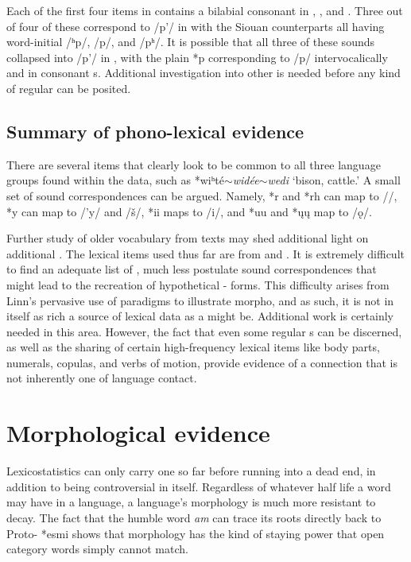 \documentclass[output=paper]{LSP/langsci}
\begin{document}
Each of the first four items in  contains a bilabial consonant in , , and . Three out of four of these correspond to /p'/ in  with the Siouan counterparts all having word-initial /ʰp/, /p/, and /pʰ/. It is possible that all three of these sounds collapsed into /p'/ in , with the plain *p corresponding to  /p/ intervocalically and in consonant s. Additional investigation into other  is needed before any kind of regular  can be posited.

\subsection{Summary of phono-lexical evidence}

There are several items that clearly look to be common to all three language groups found within the data, such as *wiʰt\'e$\sim$\emph{wid\'ee}$\sim$\emph{wedi} `bison, cattle.' A small set of sound correspondences can be argued. Namely, *r and *rh can map to /\textbeltl/, *y can map to /'y/ and /\v{s}/, *ii maps to /i/, and *uu and *\k{u}\k{u} map to /\k{o}/. 

Further study of older vocabulary from  texts may shed additional light on additional . The lexical items used thus far are from \citet{Linn2000} and \citet{Rankinetal2015AccessSeptember}. It is extremely difficult to find an adequate list of , much less postulate sound correspondences that might lead to the recreation of hypothetical - forms. This difficulty arises from Linn's pervasive use of paradigms to illustrate  morpho, and as such, it is not in itself as rich a source of lexical data as a  might be. Additional work is certainly needed in this area. However, the fact that even some regular s can be discerned, as well as the sharing of certain high-frequency lexical items like body parts, numerals, copulas, and verbs of motion, provide evidence of a connection that is not inherently one of language contact.

\section{Morphological evidence}\label{sec:kasak:5}

Lexicostatistics can only carry one so far before running into a dead end, in addition to being controversial in itself. Regardless of whatever half life a word may have in a language, a language's morphology is much more resistant to decay. The fact that the humble  word \textit{am} can trace its roots directly back to Proto- *esmi shows that morphology has the kind of staying power that open category words simply cannot match.
\end{document}
